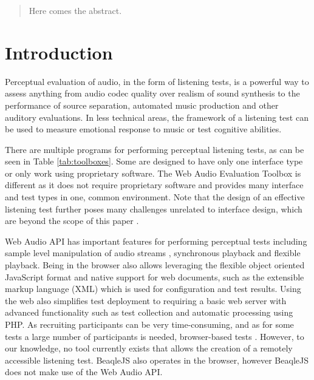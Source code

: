 \documentclass{sig-alternate}
\begin{document}
\maketitle
\begin{abstract}
Here comes the abstract. 
\end{abstract}


\section{Introduction}

	Perceptual evaluation of audio, in the form of listening tests, is a powerful way to assess anything from audio codec quality over realism of sound synthesis to the performance of source separation, automated music production and other auditory evaluations.
	In less technical areas, the framework of a listening test can be used to measure emotional response to music or test cognitive abilities. %


	There are multiple programs for performing perceptual listening tests, as can be seen in Table \ref{tab:toolboxes}. Some are designed to have only one interface type or only work using proprietary software. The Web Audio Evaluation Toolbox is different as it does not require proprietary software and provides many interface and test types in one, common environment. Note that the design of an effective listening test further poses many challenges unrelated to interface design, which are beyond the scope of this paper \cite{bech}. 

	Web Audio API has important features for performing perceptual tests including sample level manipulation of audio streams \cite{schoeffler2015mushra}, synchronous playback and flexible playback. Being in the browser also allows leveraging the flexible object oriented JavaScript format and native support for web documents, such as the extensible markup language (XML) which is used for configuration and test results. Using the web also simplifies test deployment to requiring a basic web server with advanced functionality such as test collection and automatic processing using PHP. As recruiting participants can be very time-consuming, and as for some tests a large number of participants is needed, browser-based tests \cite{schoeffler2015mushra}. However, to our knowledge, no tool currently exists that allows the creation of a remotely accessible listening test. BeaqleJS \cite{beaqlejs} also operates in the browser, however BeaqleJS does not make use of the Web Audio API.%
	
\end{document}
